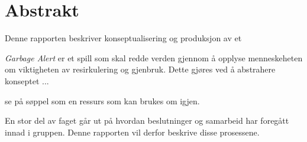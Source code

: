 \section{Abstrakt}



Denne rapporten beskriver konseptualisering og produksjon av et 


\emph{Garbage Alert} er et spill som skal redde verden gjennom å opplyse menneskeheten om viktigheten av resirkulering og gjenbruk. Dette gjøres ved å abstrahere konseptet ...

se på søppel som en ressurs som kan brukes om igjen.


En stor del av faget går ut på hvordan beslutninger og samarbeid har foregått innad i gruppen. Denne rapporten vil derfor beskrive disse prosessene.